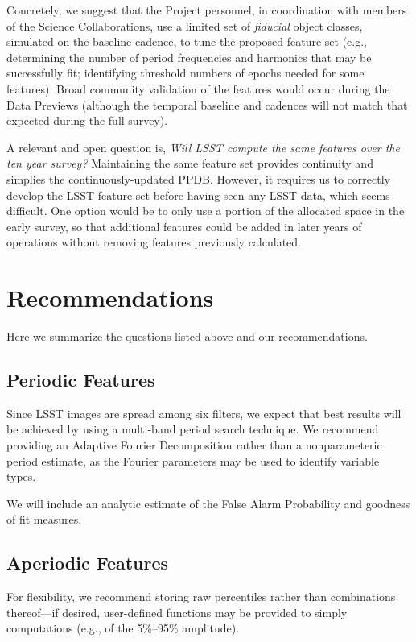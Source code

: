 \documentclass[DM,authoryear,toc]{lsstdoc}
\begin{document}
Concretely, we suggest that the Project personnel, in coordination with members of the Science Collaborations, use a limited set of \textit{fiducial} object classes, simulated on the baseline cadence, to tune the proposed feature set (e.g., determining the number of period frequencies and harmonics that may be successfully fit; identifying threshold numbers of epochs needed for some features).
Broad community validation of the features would occur during the Data Previews (although the temporal baseline and cadences will not match that expected during the full survey).

A relevant and open question is, \textit{Will LSST compute the same features over the ten year survey?}
Maintaining the same feature set provides continuity and simplies the continuously-updated PPDB.
However, it requires us to correctly develop the LSST feature set before having seen any LSST data, which seems difficult.
One option would be to only use a portion of the allocated space in the early survey, so that additional features could be added in later years of operations without removing features previously calculated.

\section{Recommendations}

Here we summarize the questions listed above and our recommendations.

\subsection{Periodic Features}

Since LSST images are spread among six filters, we expect that best results will be achieved by using a multi-band period search technique.
We recommend providing an Adaptive Fourier Decomposition rather than a nonparameteric period estimate, as the Fourier parameters may be used to identify variable types.

We will include an analytic estimate of the False Alarm Probability \citep[e.g.,][]{Baluev:08:FAP, Delisle:20:LSFAPCorrelatedNoise} and goodness of fit measures.

\subsection{Aperiodic Features}

For flexibility, we recommend storing raw percentiles rather than combinations thereof---if desired, user-defined functions may be provided to simply computations (e.g., of the 5\%--95\% amplitude).
\end{document}
